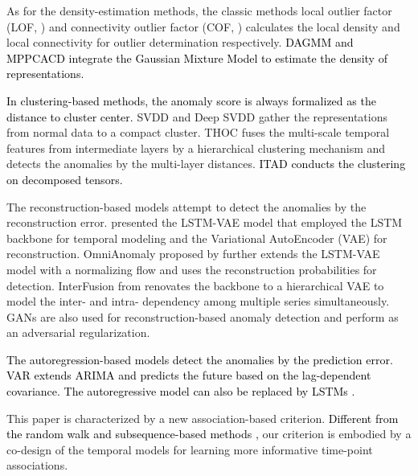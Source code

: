 \documentclass{article} %
\newcommand{\update}[1]{{\textcolor{black}{#1}}}
\begin{document}
As for the density-estimation methods, the classic methods local outlier factor (LOF, \cite{DBLP:conf/sigmod/BreunigKNS00}) and connectivity outlier factor (COF, \cite{Tang2002EnhancingEO}) calculates the local density and local connectivity for outlier determination respectively. 
\update{DAGMM \citep{DBLP:conf/iclr/ZongSMCLCC18} and MPPCACD \citep{Yairi2017ADH} integrate the Gaussian Mixture Model to estimate the density of representations.}

\update{In clustering-based methods, the anomaly score is always formalized as the distance to cluster center.} SVDD \citep{Tax2004SupportVD} and Deep SVDD \citep{DBLP:conf/icml/RuffGDSVBMK18} gather the representations from normal data to a compact cluster. THOC \citep{DBLP:conf/nips/ShenLK20} fuses the multi-scale temporal features from intermediate layers by a hierarchical clustering mechanism and detects the anomalies by the multi-layer distances. \update{ITAD \citep{Shin2020ITADIT} conducts the clustering on decomposed tensors.}

The reconstruction-based models attempt to detect the anomalies by the reconstruction error. \cite{DBLP:journals/corr/abs-1711-00614} presented the LSTM-VAE model that employed the LSTM backbone for temporal modeling and the Variational AutoEncoder (VAE) for reconstruction. OmniAnomaly proposed by \cite{Su2019RobustAD} further extends the LSTM-VAE model with a normalizing flow and uses the reconstruction probabilities for detection. InterFusion from \cite{DBLP:conf/kdd/LiZHSJWP21} renovates the backbone to a hierarchical VAE to model the inter- and intra- dependency among multiple series simultaneously. GANs \citep{Goodfellow2014GenerativeAN} are also used for reconstruction-based anomaly detection \citep{Schlegl2019fAnoGANFU,Li2019MADGANMA,Zhou2019BeatGANAR} and perform as an adversarial regularization.

\update{The autoregression-based models detect the anomalies by the prediction error. VAR extends ARIMA \citep{Anderson1976TimeSeries2E} and predicts the future based on the lag-dependent covariance. The autoregressive model can also be replaced by LSTMs \citep{Hundman2018DetectingSA,Tariq2019DetectingAI}.}

This paper is characterized by a new association-based criterion. \update{Different from the random walk and subsequence-based methods \citep{Cheng2008ARG,Boniol2020Series2GraphGS},} our criterion is embodied by a co-design of the temporal models for learning more informative time-point associations.
\end{document}
